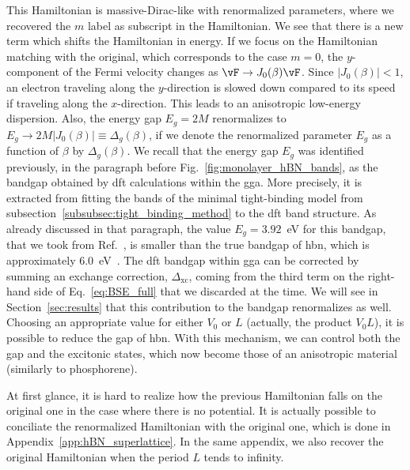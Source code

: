 \noindent This Hamiltonian is massive-Dirac-like with renormalized parameters, where we recovered the $m$ label as subscript in the Hamiltonian.
We see that there is a new term which shifts the Hamiltonian in energy.
If we focus on the Hamiltonian matching with the original, which corresponds to the case $m=0$, the $y$-component of the Fermi velocity changes as $\vF \rightarrow J_{0}(\beta)\vF $.
Since $\vert J_{0}(\beta)\vert < 1$, an electron traveling along the $y$-direction is slowed down compared to its speed if traveling along the $x$-direction.
This leads to an anisotropic low-energy dispersion.
Also, the energy gap $E_g = 2M$ renormalizes to $E_g \rightarrow 2M \vert J_{0}(\beta) \vert \equiv \Delta_g (\beta)$, if we denote the renormalized parameter $E_g$ as a function of $\beta$ by $\Delta_g(\beta)$. %
We recall that the energy gap $E_g$ was identified previously, in the paragraph before Fig.~\ref{fig:monolayer_hBN_bands}, as the bandgap obtained by \gls{dft} calculations within the \gls{gga}.
More precisely, it is extracted from fitting the bands of the minimal tight-binding model from subsection~\ref{subsubsec:tight_binding_method} to the \gls{dft} band structure.
As already discussed in that paragraph, the value $E_g = 3.92$~\unit{\electronvolt} for this bandgap, that we took from Ref.~\cite{ribeiro_stability_2011}, is smaller than the true bandgap of \gls{hbn}, which is approximately $6.0$~\unit{\electronvolt}~\cite{Yoichi_Takashi_2007,Cassabois_2019}.
The \gls{dft} bandgap within \gls{gga} can be corrected by summing an exchange correction, $\Delta_{\mathrm{xc}}$, coming from the third term on the right-hand side of Eq.~\eqref{eq:BSE_full} that we discarded at the time.
We will see in Section~\ref{sec:results} that this contribution to the bandgap renormalizes as well.
Choosing an appropriate value for either $V_{0}$ or $L$ (actually, the product $V_{0}L$), it is possible to reduce the gap of \gls{hbn}.
With this mechanism, we can control both the gap and the excitonic states, which now become those of an anisotropic material (similarly to phosphorene).

At first glance, it is hard to realize how the previous Hamiltonian falls on the original one in the case where there is no potential.
It is actually possible to conciliate the renormalized Hamiltonian with the original one, which is done in Appendix~\ref{app:hBN_superlattice}.
In the same appendix, we also recover the original Hamiltonian when the period $L$ tends to infinity.

